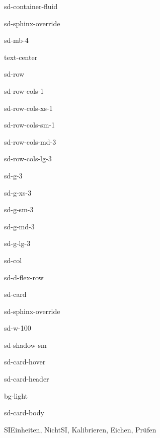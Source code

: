 \documentclass[letterpaper,10pt,english]{jupyterBook}
\let\sphinxpxdimen\pdfpxdimen\else\newdimen\sphinxpxdimen
\begin{document}
\begin{sphinxuseclass}{sd-container-fluid}
\begin{sphinxuseclass}{sd-sphinx-override}
\begin{sphinxuseclass}{sd-mb-4}
\begin{sphinxuseclass}{text-center}
\begin{sphinxuseclass}{sd-row}
\begin{sphinxuseclass}{sd-row-cols-1}
\begin{sphinxuseclass}{sd-row-cols-xs-1}
\begin{sphinxuseclass}{sd-row-cols-sm-1}
\begin{sphinxuseclass}{sd-row-cols-md-3}
\begin{sphinxuseclass}{sd-row-cols-lg-3}
\begin{sphinxuseclass}{sd-g-3}
\begin{sphinxuseclass}{sd-g-xs-3}
\begin{sphinxuseclass}{sd-g-sm-3}
\begin{sphinxuseclass}{sd-g-md-3}
\begin{sphinxuseclass}{sd-g-lg-3}
\begin{sphinxuseclass}{sd-col}
\begin{sphinxuseclass}{sd-d-flex-row}
\begin{sphinxuseclass}{sd-card}
\begin{sphinxuseclass}{sd-sphinx-override}
\begin{sphinxuseclass}{sd-w-100}
\begin{sphinxuseclass}{sd-shadow-sm}
\begin{sphinxuseclass}{sd-card-hover}
\begin{sphinxuseclass}{sd-card-header}
\begin{sphinxuseclass}{bg-light}
\sphinxAtStartPar
{}

\end{sphinxuseclass}
\end{sphinxuseclass}
\begin{sphinxuseclass}{sd-card-body}
\noindent\sphinxincludegraphics[height=120\sphinxpxdimen]{{SI}.png}

\sphinxAtStartPar
SI\sphinxhyphen{}Einheiten, Nicht\sphinxhyphen{}SI, Kalibrieren, Eichen, Prüfen


\end{sphinxuseclass}
\end{sphinxuseclass}
\end{sphinxuseclass}
\end{sphinxuseclass}
\end{sphinxuseclass}
\end{sphinxuseclass}
\end{sphinxuseclass}
\end{sphinxuseclass}
\end{sphinxuseclass}
\end{sphinxuseclass}
\end{sphinxuseclass}
\end{sphinxuseclass}
\end{sphinxuseclass}
\end{sphinxuseclass}
\end{sphinxuseclass}
\end{sphinxuseclass}
\end{sphinxuseclass}
\end{sphinxuseclass}
\end{sphinxuseclass}
\end{sphinxuseclass}
\end{sphinxuseclass}
\end{sphinxuseclass}
\end{sphinxuseclass}
\end{document}
